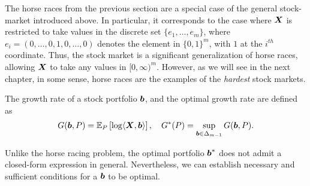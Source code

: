     \begin{remark}
        \label{remark:stock-market-vs-horse-races} The horse races from the previous section are a special case of the general stock-market introduced above. In particular, it corresponds to the case where $\boldsymbol{X}$ is restricted to take values in the discrete set $\{e_1, \ldots, e_m\}$, where $e_i = (0, \ldots, 0, 1, 0, \ldots, 0)$ denotes the element in $\{0,1\}^m$, with $1$ at the $i^{th}$ coordinate. Thus, the stock market is a significant generalization of horse races, allowing $\boldsymbol{X}$ to take any values in $[0,\infty)^m$. However, as we will see in the next chapter, in some sense, horse races are the examples of the \emph{hardest}  stock markets. 
    \end{remark}

    The growth rate of a stock portfolio $\boldsymbol{b}$, and the optimal growth rate are defined  as 
    \begin{align}
        G(\boldsymbol{b}, P) = \mathbb{E}_P\left[ \log \langle \boldsymbol{X}, \boldsymbol{b} \rangle \right], \quad G^*(P) = \sup_{ \boldsymbol{b} \in \Delta_{m-1}}  G(\boldsymbol{b}, P). 
    \end{align}

    Unlike the horse racing problem, the optimal portfolio $\boldsymbol{b}^*$ does not admit a closed-form expression in general. Nevertheless, we can establish necessary and sufficient conditions for a $\boldsymbol{b}$ to be optimal. 

